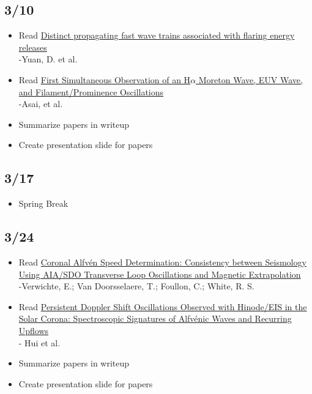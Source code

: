 \documentclass[12pt]{article}
\begin{document}
\subsection*{3/10}
\begin{itemize}
    \item Read \href{http://cdsads.u-strasbg.fr/abs/2013A\%26A...554A.144Y}
        {\textcolor{cobalt}{Distinct propagating fast wave trains associated
        with flaring energy releases}}\\
         -Yuan, D. et al.
     \item Read \href{http://cdsads.u-strasbg.fr/abs/2012ApJ...745L..18A}
        {\textcolor{cobalt}{First Simultaneous Observation of an H$\alpha$
        Moreton Wave, EUV Wave, and Filament/Prominence Oscillations}}\\
        -Asai, et al.
    \item Summarize papers in writeup
    \item Create presentation slide for papers
\end{itemize}

\subsection*{3/17}
\begin{itemize}
    \item Spring Break
\end{itemize}

\subsection*{3/24}
\begin{itemize}
    \item Read \href{http://cdsads.u-strasbg.fr/abs/2013ApJ...767...16V}
        {Coronal Alfv\'en Speed Determination:
        Consistency between Seismology Using AIA/SDO Transverse Loop
        Oscillations and Magnetic Extrapolation}\\
        -Verwichte, E.; Van Doorsselaere, T.; Foullon, C.; White, R. S.
    \item Read \href{http://cdsads.u-strasbg.fr/abs/2012ApJ...759..144T}
        {Persistent Doppler Shift Oscillations
                Observed with Hinode/EIS in the Solar Corona:
                Spectroscopic Signatures of Alfv\'enic Waves and Recurring Upflows}\\
        - Hui et al.
    \item Summarize papers in writeup
    \item Create presentation slide for papers
\end{itemize}
\end{document}

